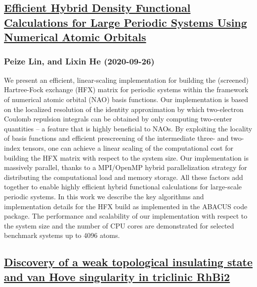 \subsection*{\href{http://arxiv.org/abs/2009.12505v1}{Efficient Hybrid Density Functional Calculations for Large Periodic  Systems Using Numerical Atomic Orbitals}}
\subsubsection*{Peize Lin, and Lixin He (2020-09-26)}
We present an efficient, linear-scaling implementation for building the
(screened) Hartree-Fock exchange (HFX) matrix for periodic systems within the
framework of numerical atomic orbital (NAO) basis functions. Our implementation
is based on the localized resolution of the identity approximation by which
two-electron Coulomb repulsion integrals can be obtained by only computing
two-center quantities -- a feature that is highly beneficial to NAOs. By
exploiting the locality of basis functions and efficient prescreening of the
intermediate three- and two-index tensors, one can achieve a linear scaling of
the computational cost for building the HFX matrix with respect to the system
size. Our implementation is massively parallel, thanks to a MPI/OpenMP hybrid
parallelization strategy for distributing the computational load and memory
storage. All these factors add together to enable highly efficient hybrid
functional calculations for large-scale periodic systems. In this work we
describe the key algorithms and implementation details for the HFX build as
implemented in the ABACUS code package. The performance and scalability of our
implementation with respect to the system size and the number of CPU cores are
demonstrated for selected benchmark systems up to 4096 atoms.

\subsection*{\href{http://arxiv.org/abs/2009.12502v1}{Discovery of a weak topological insulating state and van Hove  singularity in triclinic RhBi2}}
